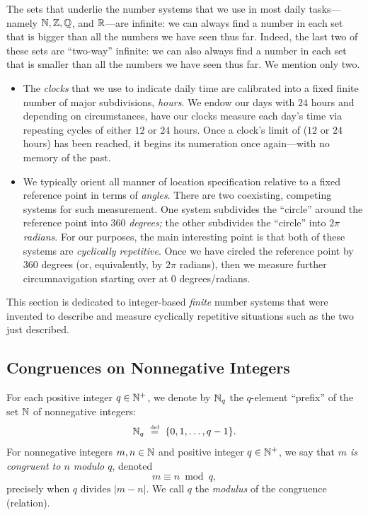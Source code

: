 The sets that underlie the number systems that we use in most daily tasks---namely $\mathbb{N}, \mathbb{Z}, \mathbb{Q}$, and $\mathbb{R}$---are infinite: we can always find a number in each set that is bigger than all the numbers we have seen thus far.  Indeed, the last two of these sets are ``two-way'' infinite: we can also always find a number in each set that is smaller than all the numbers we have seen thus far.  We mention only two.
\begin{itemize}
\item
The {\em clocks} that we use to indicate daily time are calibrated into a fixed finite number of major subdivisions, {\em hours}.  We endow our days with $24$ hours and depending on circumstances, have our clocks measure each day's time via repeating cycles of either $12$ or $24$ hours.  Once a clock's limit of ($12$ or $24$ hours) has been reached, it begins its numeration once again---with no memory of the past.

\medskip\item
We typically orient all manner of location specification relative to a fixed reference point in terms of {\em angles}.  There are two coexisting, competing systems for such measurement.  One system subdivides the ``circle'' around the reference point into $360$ {\em degrees;} the other subdivides the ``circle'' into $2 \pi$ {\em radians}.  For our purposes, the main interesting point is that both of these systems are {\em cyclically repetitive}.  Once we have circled the reference point by $360$ degrees (or, equivalently, by $2 \pi$ radians), then we measure further circumnavigation starting over at $0$ degrees/radians.
\end{itemize}

This section is dedicated to integer-based {\em finite} number systems that were invented to describe and measure cyclically repetitive situations such as the two just described.

\subsection{Congruences on Nonnegative Integers}
\label{sec:congruences}

 
For each positive integer $q \in \mathbb{N}^+$, we denote by $\mathbb{N}_q$ the $q$-element ``prefix'' of the set $\mathbb{N}$ of nonnegative integers:
\[ \mathbb{N}_q \ \stackrel{\mbox{{\tiny def}}}{=} \ \{0, 1, \ldots, q-1\} . \]
For nonnegative integers $m, n \in \mathbb{N}$ and positive integer $q \in \mathbb{N}^+$, we say that {\em $m$ is congruent to $n$ modulo $q$}, denoted
\[ m \equiv n \bmod q, \]
precisely when $q \mbox{ divides } |m-n|$.  We call $q$ the {\it modulus} of the congruence (relation).


